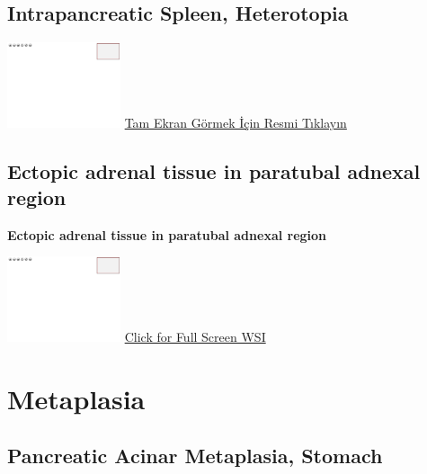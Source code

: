 \documentclass[
  letterpaper,
  paper=6in:9in,
  pagesize=pdftex,
  headinclude=on,
  footinclude=on,
  12pt]{scrbook}
\begin{document}
\hypertarget{sec-intrapancreatic-spleen}{%
\section{Intrapancreatic Spleen,
Heterotopia}\label{sec-intrapancreatic-spleen}}

\href{https://images.patolojiatlasi.com/template/HE.html}{\includegraphics[width=0.25\textwidth,height=\textheight]{./screenshots/template_screenshot.png}}
\href{https://images.patolojiatlasi.com/intrapancreaticspleen/HE.html}{Tam
Ekran Görmek İçin Resmi Tıklayın}

\hypertarget{sec-ectopic-adrenal-tissue-paratubal-adnexial-tissue}{%
\section{Ectopic adrenal tissue in paratubal adnexal
region}\label{sec-ectopic-adrenal-tissue-paratubal-adnexial-tissue}}

\textbf{Ectopic adrenal tissue in paratubal adnexal region}

\href{https://images.patolojiatlasi.com/template/HE.html}{\includegraphics[width=0.25\textwidth,height=\textheight]{./screenshots/template_screenshot.png}}
\href{https://images.patolojiatlasi.com/ectopic-adrenal/HE.html}{Click
for Full Screen WSI}

\hypertarget{sec-metaplasia}{%
\chapter{Metaplasia}\label{sec-metaplasia}}

\hypertarget{sec-pancreatic-acinar-metaplasia}{%
\section{Pancreatic Acinar Metaplasia,
Stomach}\label{sec-pancreatic-acinar-metaplasia}}
\end{document}
